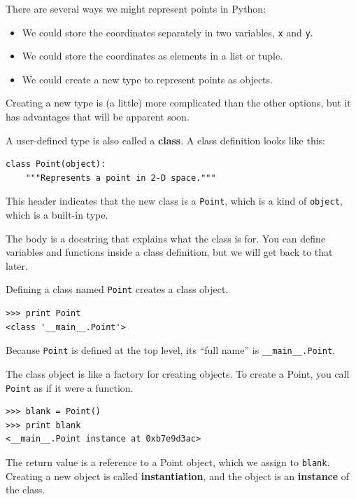 \documentclass[10pt]{book}
\begin{document}
There are several ways we might represent points in Python:

\begin{itemize}

\item We could store the coordinates separately in two
variables, {\tt x} and {\tt y}.

\item We could store the coordinates as elements in a list
or tuple.

\item We could create a new type to represent points as
objects.

\end{itemize}

Creating a new type
is (a little) more complicated than the other options, but
it has advantages that will be apparent soon.

A user-defined type is also called a {\bf class}.
A class definition looks like this:

\begin{verbatim}
class Point(object):
    """Represents a point in 2-D space."""
\end{verbatim}
%
This header indicates that the new class is a {\tt Point},
which is a kind of {\tt object}, which is a built-in
type.

The body is a docstring that explains what the class is for.
You can define variables and functions inside a class definition,
but we will get back to that later.

Defining a class named {\tt Point} creates a class object.

\begin{verbatim}
>>> print Point
<class '__main__.Point'>
\end{verbatim}
%
Because {\tt Point} is defined at the top level, its ``full
name'' is \verb"__main__.Point".

The class object is like a factory for creating objects.  To create a
Point, you call {\tt Point} as if it were a function.

\begin{verbatim}
>>> blank = Point()
>>> print blank
<__main__.Point instance at 0xb7e9d3ac>
\end{verbatim}
%
The return value is a reference to a Point object, which we
assign to {\tt blank}.  
Creating a new object is called
{\bf instantiation}, and the object is an {\bf instance} of
the class.
\end{document}
